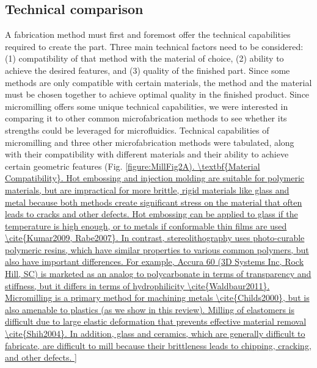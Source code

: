 \subsection{Technical comparison}
A fabrication method must first and foremost offer the technical capabilities required to create the part. Three main technical factors need to be considered: (1) compatibility of that method with the material of choice, (2) ability to achieve the desired features, and (3) quality of the finished part. Since some methods are only compatible with certain materials, the method and the material must be chosen together to achieve optimal quality in the finished product. Since micromilling offers some unique technical capabilities, we were interested in comparing it to other common microfabrication methods to see whether its strengths could be leveraged for microfluidics. Technical capabilities of micromilling and three other microfabrication methods were tabulated, along with their compatibility with different materials and their ability to achieve certain geometric features (Fig. \ref{figure:MillFig2A). 

\textbf{Material Compatibility}. Hot embossing and injection molding are suitable for polymeric materials, but are impractical for more brittle, rigid materials like glass and metal because both methods create significant stress on the material that often leads to cracks and other defects. Hot embossing can be applied to glass if the temperature is high enough, or to metals if conformable thin films are used \cite{Kumar2009, Rabe2007}. In contrast, stereolithography uses photo-curable polymeric resins, which have similar properties to various common polymers, but also have important differences. For example, Accura 60 (3D Systems Inc, Rock Hill, SC) is marketed as an analog to polycarbonate in terms of transparency and stiffness, but it differs in terms of hydrophilicity \cite{Waldbaur2011}. Micromilling is a primary method for machining metals \cite{Childs2000}, but is also amenable to plastics (as we show in this review). Milling of elastomers is difficult due to large elastic deformation that prevents effective material removal \cite{Shih2004}. In addition, glass and ceramics, which are generally difficult to fabricate, are difficult to mill because their brittleness leads to chipping, cracking, and other defects.

}
